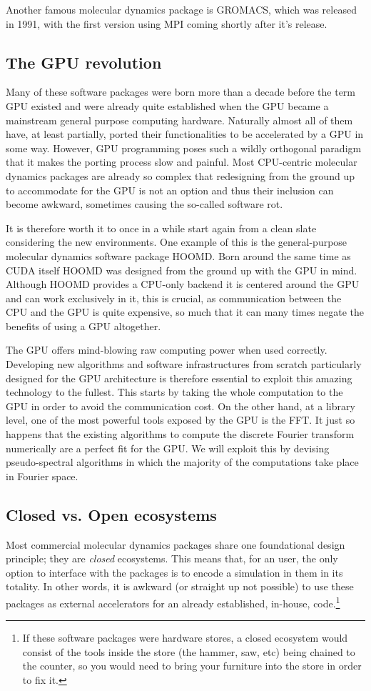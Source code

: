 \documentclass[ twoside,openright,titlepage,numbers=noenddot,%
headinclude,footinclude,cleardoublepage=empty,abstract=on,
BCOR=5mm,paper=a4,fontsize=11pt, dvipsnames
]{scrreprt}
\newcommand{\gpu}{\gls{GPU}\xspace}
\begin{document}
Another famous molecular dynamics package is GROMACS, which was released in 1991, with the first version using MPI coming shortly after it's release.

\subsection*{The GPU revolution}
Many of these software packages were born more than a decade before the term \gpu existed and were already quite established when the \gpu became a mainstream general purpose computing hardware. Naturally almost all of them have, at least partially, ported their functionalities to be accelerated by a \gpu in some way. However, \gpu programming poses such a wildly orthogonal paradigm that it makes the porting process slow and painful. Most CPU-centric molecular dynamics packages are already so complex that redesigning from the ground up to accommodate for the \gpu is not an option and thus their inclusion can become awkward, sometimes causing the so-called software rot.

It is therefore worth it to once in a while start again from a clean slate considering the new environments. One example of this is the general-purpose molecular dynamics software package HOOMD\cite{Anderson2008}. Born around the same time as CUDA itself HOOMD was designed from the ground up with the \gpu in mind. Although HOOMD provides a CPU-only backend it is centered around the \gpu and can work exclusively in it, this is crucial, as communication between the CPU and the \gpu is quite expensive, so much that it can many times negate the benefits of using a \gpu altogether.

The \gpu offers mind-blowing raw computing power when used correctly. Developing new algorithms and software infrastructures from scratch particularly designed for the \gpu architecture is therefore essential to exploit this amazing technology to the fullest. This starts by taking the whole computation to the \gpu in order to avoid the communication cost. On the other hand, at a library level, one of the most powerful tools exposed by the \gpu is the \gls{FFT}. It just so happens that the existing algorithms to compute the discrete Fourier transform numerically are a perfect fit for the \gpu. We will exploit this by devising pseudo-spectral algorithms in which the majority of the computations take place in Fourier space.

\subsection*{Closed vs. Open ecosystems}
Most commercial molecular dynamics packages share one foundational design principle; they are \emph{closed} ecosystems. This means that, for an user, the only option to interface with the packages is to encode a simulation in them in its totality. In other words, it is awkward (or straight up not possible) to use these packages as external accelerators for an already established, in-house, code.\footnote{If these software packages were hardware stores, a closed ecosystem would consist of the tools inside the store (the hammer, saw, etc) being chained to the counter, so you would need to bring your furniture into the store in order to fix it.}  
\end{document}
